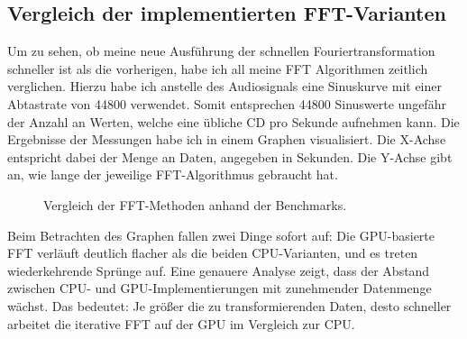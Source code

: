 \documentclass[a4paper,12pt]{article}
\theoremstyle{definition}
\theoremstyle{remark}
\begin{document}
\subsection{Vergleich der implementierten FFT-Varianten}
Um zu sehen, ob meine neue Ausführung der schnellen Fouriertransformation schneller ist als die vorherigen, habe ich all meine FFT 
Algorithmen zeitlich verglichen. Hierzu habe ich anstelle des Audiosignals eine Sinuskurve mit einer Abtastrate von 44800 verwendet. 
Somit entsprechen 44800 Sinuswerte ungefähr der Anzahl an Werten, welche eine übliche CD pro Sekunde aufnehmen kann. Die Ergebnisse der 
Messungen habe ich in einem Graphen visualisiert. Die X-Achse entspricht dabei der Menge an Daten, angegeben in Sekunden. Die Y-Achse 
gibt an, wie lange der jeweilige FFT-Algorithmus gebraucht hat. 
\begin{figure}[H]
  \centering
  \caption{Vergleich der FFT-Methoden anhand der Benchmarks.}
\end{figure}

Beim Betrachten des Graphen fallen zwei Dinge sofort auf: Die GPU-basierte FFT verläuft deutlich flacher als die beiden CPU-Varianten, 
und es treten wiederkehrende Sprünge auf. Eine genauere Analyse zeigt, dass der Abstand zwischen CPU- und GPU-Implementierungen mit 
zunehmender Datenmenge wächst. Das bedeutet: Je größer die zu transformierenden Daten, desto schneller arbeitet die iterative FFT auf 
der GPU im Vergleich zur CPU.
\end{document}
